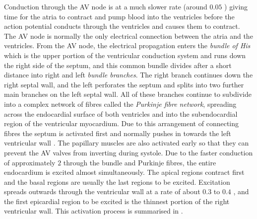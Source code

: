Conduction through the AV node is at a much slower rate (around $0.05$ \mps)
giving time for the atria to contract and pump blood into the ventricles
before the action potential conducts through the ventricles and causes them to
contract.  The AV node is normally the only electrical connection between the
atria and the ventricles.  From the AV node, the electrical propagation enters
the \emph{bundle of His} which is the upper portion of the ventricular
conduction system and runs down the right side of the septum, and this common
bundle divides after a short distance into right and left \emph{bundle
  branches}.  The right branch continues down the right septal wall, and the
left perforates the septum and splits into two further main branches on the
left septal wall.  All of these branches continue to subdivide into a complex
network of fibres called the \emph{Purkinje fibre network}, spreading across
the endocardial surface of both ventricles and into the subendocardial region
of the ventricular myocardium.  Due to this arrangement of connecting fibres
the septum is activated first and normally pushes in towards the left
ventricular wall \cite{durrer:1970}.  The papillary muscles are also activated
early so that they can prevent the AV valves from inverting during systole.
Due to the faster conduction of approximately $2$ \mps through the
bundle and Purkinje fibres, the entire endocardium is excited almost
simultaneously.  The apical regions contract first and the basal regions are
usually the last regions to be excited.  Excitation spreads outwards through
the ventricular wall at a rate of about $0.3$ to $0.4$ \mps, and
the first epicardial region to be excited is the thinnest portion of the right
ventricular wall.  This activation process is summarised in
.
